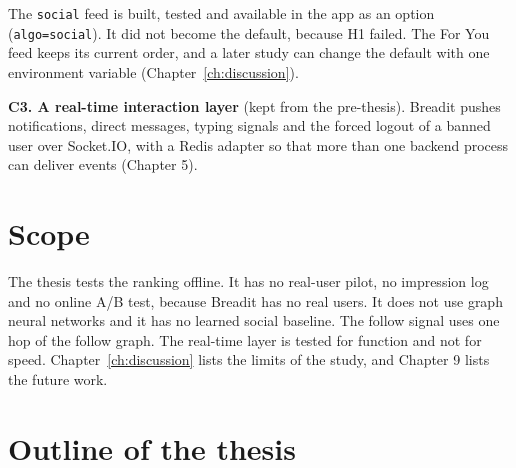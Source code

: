 The \texttt{social} feed is built, tested and available in the app as an option (\texttt{algo\allowbreak=social}). It did not become the default, because H1 failed. The For You feed keeps its current order, and a later study can change the default with one environment variable (Chapter~\ref{ch:discussion}).

\textbf{C3. A real-time interaction layer} (kept from the pre-thesis). Breadit pushes notifications, direct messages, typing signals and the forced logout of a banned user over Socket.IO, with a Redis adapter so that more than one backend process can deliver events (Chapter 5).

\section{Scope}
\label{sec:intro-scope}

The thesis tests the ranking offline. It has no real-user pilot, no impression log and no online A/B test, because Breadit has no real users. It does not use graph neural networks and it has no learned social baseline. The follow signal uses one hop of the follow graph. The real-time layer is tested for function and not for speed. Chapter~\ref{ch:discussion} lists the limits of the study, and Chapter 9 lists the future work.

\section{Outline of the thesis}
\label{sec:intro-outline}

